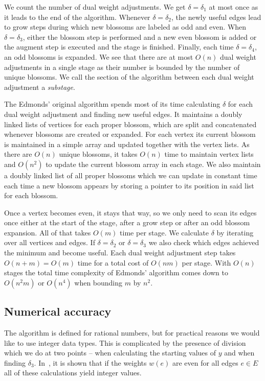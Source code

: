 We count the number of dual weight adjustments. We get $\delta = \delta_1$ at most once as it leads to the end of the algorithm. Whenever $\delta = \delta_2$, the newly useful edges lead to grow steps during which new blossoms are labeled as odd and even. When $\delta = \delta_3$, either the blossom step is performed and a new even blossom is added or the augment step is executed and the stage is finished. Finally, each time $\delta = \delta_4$, an odd blossoms is expanded. We see that there are at most $O(n)$ dual weight adjustments in a single stage as their number is bounded by the number of unique blossoms. We call the section of the algorithm between each dual weight adjustment a \textit{substage}.

The Edmonds' original algorithm spends most of its time calculating $\delta$ for each dual weight adjustment and finding new useful edges. It maintains a doubly linked lists of vertices for each proper blossom, which are split and concatenated whenever blossoms are created or expanded. For each vertex its current blossom is maintained in a simple array and updated together with the vertex lists. As there are $O(n)$ unique blossoms, it takes $O(n)$ time to maintain vertex lists and $O(n^2)$ to update the current blossom array in each stage. We also maintain a doubly linked list of all proper blossoms which we can update in constant time each time a new blossom appears by storing a pointer to its position in said list for each blossom.

Once a vertex becomes even, it stays that way, so we only need to scan its edges once either at the start of the stage, after a grow step or after an odd blossom expansion. All of that takes $O(m)$ time per stage. We calculate $\delta$ by iterating over all vertices and edges. If $\delta = \delta_2$ or $\delta = \delta_3$ we also check which edges achieved the minimum and become useful. Each dual weight adjustment step takes $O(n+m)=O(m)$ time for a total cost of $O(nm)$ per stage. With $O(n)$ stages the total time complexity of Edmonds' algorithm comes down to $O(n^2m)$ or $O(n^4)$ when bounding $m$ by $n^2$.

\subsection{Numerical accuracy}

The algorithm is defined for rational numbers, but for practical reasons we would like to use integer data types. This is complicated by the presence of division which we do at two points – when calculating the starting values of $y$ and when finding $\delta_3$. In~\cite{gabow1974implementation}, it is shown that if the weights $w(e)$ are even for all edges $e\in E$ all of these calculations yield integer values.

